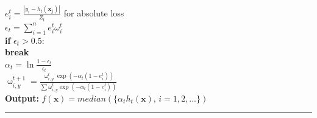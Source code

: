 \documentclass[a4paper]{article}
\begin{document}
			    \hspace*{48pt}	$e_i^t = \frac{|y_i-h_t(\textbf{x}_j)|}{Z_t}$ for absolute loss\\
			    \hspace*{48pt}	$\epsilon_t = \sum_{i=1}^{n}e_i^t\omega_i^t$\\
			    \hspace*{48pt}	\textbf{if} $\epsilon_t > 0.5$: \\
			    \hspace*{64pt}	\textbf{break}\\
			    \hspace*{48pt}	$\alpha_t = \ln\frac{1-\epsilon_t}{\epsilon_t}$\\
			    \hspace*{48pt}	$\upomega_{i,y}^{t+1} = \frac{\upomega_{i,y}^{t}\exp(-\alpha_t(1-e_i^t))}{\sum\omega_{i,y}^{t}\exp(-\alpha_t(1-e_i^t))}$\\
			\textbf{Output:} $f(\textbf{x}) = median(\{\alpha_th_t(\textbf{x}),\,i=1,2,...\})$\\
			\noindent\rule[0.1\baselineskip]{\textwidth}{0.75pt}
\end{document}
